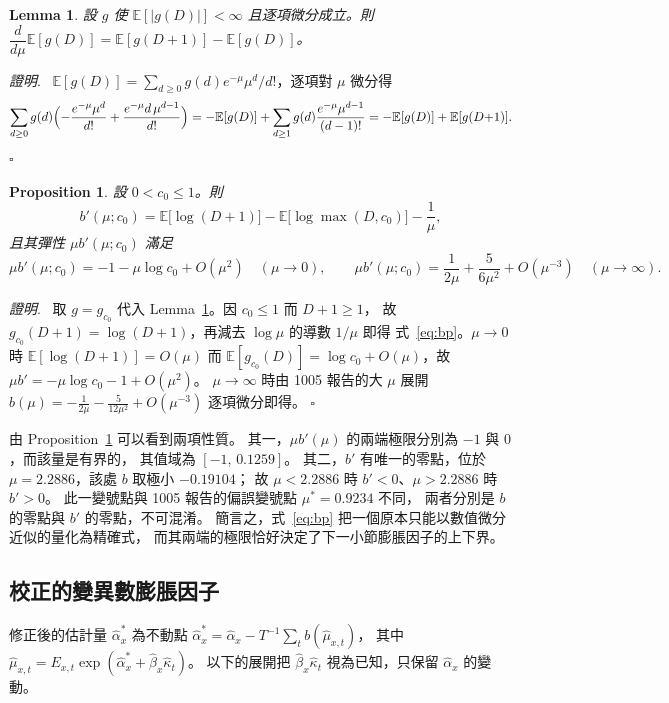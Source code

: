 \documentclass[UTF8, fontset=macnew, a4paper, 12pt]{ctexart}
\newcommand{\Ex}{\mathbb{E}}
\newtheorem{prop}{Proposition}
\newtheorem{lem}{Lemma}
\newenvironment{proof}{\par\noindent\textit{證明}.\ }{\hfill$\square$\par\vspace{4pt}}
\begin{document}
\begin{lem}\label{lem:diff}
設 $g$ 使 $\Ex[|g(D)|]<\infty$ 且逐項微分成立。則
$\dfrac{d}{d\mu}\Ex[g(D)]=\Ex[g(D{+}1)]-\Ex[g(D)]$。
\end{lem}

\begin{proof}
$\Ex[g(D)]=\sum_{d\ge0}g(d)e^{-\mu}\mu^{d}/d!$，逐項對 $\mu$ 微分得
\[
\sum_{d\ge0}g(d)\Bigl(-\frac{e^{-\mu}\mu^{d}}{d!}
+\frac{e^{-\mu}d\,\mu^{d-1}}{d!}\Bigr)
=-\Ex[g(D)]+\sum_{d\ge1}g(d)\frac{e^{-\mu}\mu^{d-1}}{(d-1)!}
=-\Ex[g(D)]+\Ex[g(D{+}1)].
\]
\end{proof}

\begin{prop}\label{prop:bp}
設 $0<c_0\le1$。則
\begin{equation}\label{eq:bp}
b'(\mu;c_0)=\Ex\bigl[\log(D{+}1)\bigr]-\Ex\bigl[\log\max(D,c_0)\bigr]-\frac{1}{\mu},
\end{equation}
且其彈性 $\mu b'(\mu;c_0)$ 滿足
\[
\mu b'(\mu;c_0)=-1-\mu\log c_0+O(\mu^2)\quad(\mu\to0),\qquad
\mu b'(\mu;c_0)=\frac{1}{2\mu}+\frac{5}{6\mu^{2}}+O(\mu^{-3})\quad(\mu\to\infty).
\]
\end{prop}

\begin{proof}
取 $g=g_{c_0}$ 代入 Lemma~\ref{lem:diff}。因 $c_0\le1$ 而 $D+1\ge1$，
故 $g_{c_0}(D{+}1)=\log(D{+}1)$，再減去 $\log\mu$ 的導數 $1/\mu$ 即得
式~\eqref{eq:bp}。$\mu\to0$ 時 $\Ex[\log(D{+}1)]=O(\mu)$ 而
$\Ex[g_{c_0}(D)]=\log c_0+O(\mu)$，故 $\mu b'=-\mu\log c_0-1+O(\mu^2)$。
$\mu\to\infty$ 時由 1005 報告的大 $\mu$ 展開
$b(\mu)=-\frac{1}{2\mu}-\frac{5}{12\mu^{2}}+O(\mu^{-3})$ 逐項微分即得。
\end{proof}

由 Proposition~\ref{prop:bp} 可以看到兩項性質。
其一，$\mu b'(\mu)$ 的兩端極限分別為 $-1$ 與 $0$，而該量是有界的，
其值域為 $[-1,\,0.1259]$。
其二，$b'$ 有唯一的零點，位於 $\mu=2.2886$，該處 $b$ 取極小 $-0.19104$；
故 $\mu<2.2886$ 時 $b'<0$、$\mu>2.2886$ 時 $b'>0$。
此一變號點與 1005 報告的偏誤變號點 $\mu^{\ast}=0.9234$ 不同，
兩者分別是 $b$ 的零點與 $b'$ 的零點，不可混淆。
簡言之，式~\eqref{eq:bp} 把一個原本只能以數值微分近似的量化為精確式，
而其兩端的極限恰好決定了下一小節膨脹因子的上下界。

\subsection{校正的變異數膨脹因子}

修正後的估計量 $\hat\alpha^{\ast}_x$ 為不動點
$\hat\alpha^{\ast}_x=\hat\alpha_x-T^{-1}\sum_t b(\hat\mu_{x,t})$，
其中 $\hat\mu_{x,t}=E_{x,t}\exp(\hat\alpha^{\ast}_x+\hat\beta_x\hat\kappa_t)$。
以下的展開把 $\hat\beta_x\hat\kappa_t$ 視為已知，只保留 $\hat\alpha_x$ 的變動。
\end{document}
